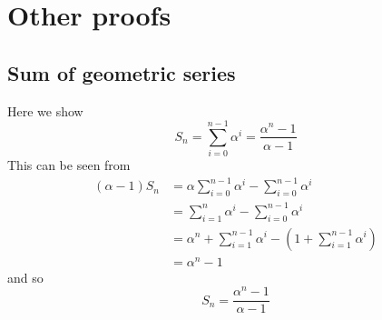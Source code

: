 \documentclass{report}
\begin{document}
\appendix
\chapter{Other proofs}
\section{Sum of geometric series}
Here we show
\begin{equation*}
S_n=\sum^{n-1}_{i=0}\alpha^i=\frac{\alpha^n-1}{\alpha-1}
\end{equation*}
This can be seen from
\begin{align*}
(\alpha-1)S_n&=\alpha\sum^{n-1}_{i=0}\alpha^i-\sum^{n-1}_{i=0}\alpha^i\\
&=\sum^{n}_{i=1}\alpha^i-\sum^{n-1}_{i=0}\alpha^i\\
&=\alpha^n+\sum^{n-1}_{i=1}\alpha^i-(1+\sum^{n-1}_{i=1}\alpha^i)\\
&=\alpha^n-1
\end{align*}
and so
\begin{equation*}
S_n=\frac{\alpha^n-1}{\alpha-1}
\end{equation*}
\end{document}
